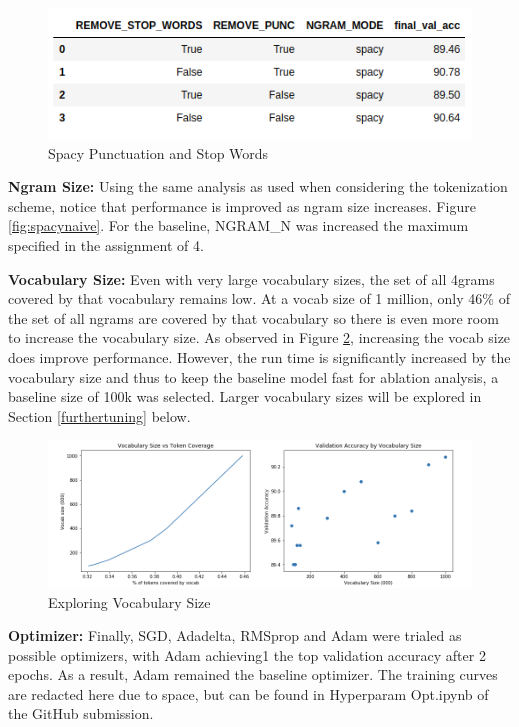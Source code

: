 \documentclass[a4paper,10pt]{article}
\begin{document}
\begin{figure}[h]
    \centering
    \includegraphics[scale=0.4]{spacyoptions}
    \caption{Spacy Punctuation and Stop Words}
    \label{fig:spacyoptions}
\end{figure}

\par
\justify
\textbf{Ngram Size:} Using the same analysis as used when considering the tokenization scheme, notice that performance is improved as ngram size increases. Figure \ref{fig:spacynaive}. For the baseline, NGRAM\_N was increased the maximum specified in the assignment of 4.

\par
\justify
\textbf{Vocabulary Size:} Even with very large vocabulary sizes, the set of all 4grams covered by that vocabulary remains low. At a vocab size of 1 million, only 46\% of the set of all ngrams are covered by that vocabulary so there is even more room to increase the vocabulary size. As observed in Figure \ref{fig:vocabsize}, increasing the vocab size does improve performance. However, the run time is significantly increased by the vocabulary size and thus to keep the baseline model fast for ablation analysis, a baseline size of 100k was selected. Larger vocabulary sizes will be explored in Section \ref{furthertuning} below.


\begin{figure}[h]
    \centering
    \includegraphics[scale=0.3]{vocabsize}
    \caption{Exploring Vocabulary Size}
    \label{fig:vocabsize}
\end{figure}

\par
\justify
\textbf{Optimizer:} Finally, SGD, Adadelta, RMSprop and Adam were trialed as possible optimizers, with Adam achieving1 the top validation accuracy after 2 epochs. As a result, Adam remained the baseline optimizer. The training curves are redacted here due to space, but can be found in Hyperparam Opt.ipynb of the GitHub submission.
\end{document}
